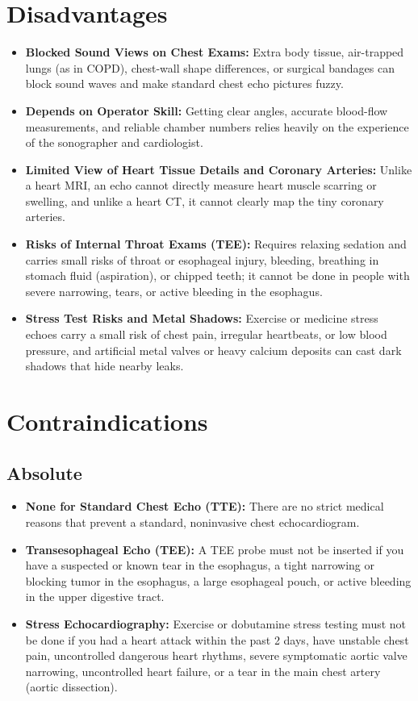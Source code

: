 \section{Disadvantages}
\begin{itemize}
\item \textbf{Blocked Sound Views on Chest Exams:} Extra body tissue, air-trapped lungs (as in COPD), chest-wall shape differences, or surgical bandages can block sound waves and make standard chest echo pictures fuzzy.
\item \textbf{Depends on Operator Skill:} Getting clear angles, accurate blood-flow measurements, and reliable chamber numbers relies heavily on the experience of the sonographer and cardiologist.
\item \textbf{Limited View of Heart Tissue Details and Coronary Arteries:} Unlike a heart MRI, an echo cannot directly measure heart muscle scarring or swelling, and unlike a heart CT, it cannot clearly map the tiny coronary arteries.
\item \textbf{Risks of Internal Throat Exams (TEE):} Requires relaxing sedation and carries small risks of throat or esophageal injury, bleeding, breathing in stomach fluid (aspiration), or chipped teeth; it cannot be done in people with severe narrowing, tears, or active bleeding in the esophagus.
\item \textbf{Stress Test Risks and Metal Shadows:} Exercise or medicine stress echoes carry a small risk of chest pain, irregular heartbeats, or low blood pressure, and artificial metal valves or heavy calcium deposits can cast dark shadows that hide nearby leaks.
\end{itemize}

\section{Contraindications}

\subsection{Absolute}
\begin{itemize}
\item \textbf{None for Standard Chest Echo (TTE):} There are no strict medical reasons that prevent a standard, noninvasive chest echocardiogram.
\item \textbf{Transesophageal Echo (TEE):} A TEE probe must not be inserted if you have a suspected or known tear in the esophagus, a tight narrowing or blocking tumor in the esophagus, a large esophageal pouch, or active bleeding in the upper digestive tract.
\item \textbf{Stress Echocardiography:} Exercise or dobutamine stress testing must not be done if you had a heart attack within the past 2 days, have unstable chest pain, uncontrolled dangerous heart rhythms, severe symptomatic aortic valve narrowing, uncontrolled heart failure, or a tear in the main chest artery (aortic dissection).
\end{itemize}

